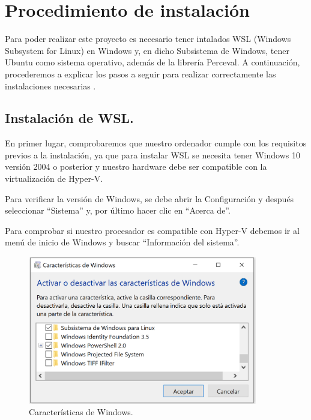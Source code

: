 \documentclass[a4paper, 12pt]{book}
\begin{document}
\section{Procedimiento de instalación} %
\label{sec:procedimiento de instalación}

Para poder realizar este proyecto es necesario tener intalados WSL (Windows Subsystem for Linux) en Windows y, en dicho Subsistema de Windows, tener Ubuntu como sistema operativo, además de la librería Perceval. 
A continuación, procederemos a explicar los pasos a seguir para realizar correctamente las instalaciones necesarias .

\subsection{Instalación de WSL.} %
\label{sec:instalación de WSL}

En primer lugar, comprobaremos que nuestro ordenador cumple con los requisitos previos a la instalación, ya que para instalar WSL se necesita tener Windows 10 versión 2004 o posterior y nuestro hardware debe ser compatible con la virtualización de Hyper-V. 


Para verificar la versión de Windows, se debe abrir la Configuración y después seleccionar ``Sistema'' y, por último hacer clic en ``Acerca de''.


Para comprobar si nuestro procesador es compatible con Hyper-V debemos ir al menú de inicio de Windows y buscar ``Información del sistema''.

\begin{figure}
  \centering
  \includegraphics[width=10cm, keepaspectratio]{img/CaracteristicasWindows.PNG}
  \caption{Características de Windows.}\label{fig:CaracteristicasWindows}
\end{figure}
\end{document}
